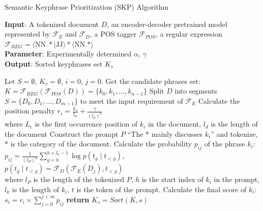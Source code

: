 \documentclass[11pt]{article}
\begin{document}
\begin{algorithm*}[htb]
    \scriptsize
    \caption{Semantic Keyphrase Prioritization (SKP) Algorithm}
    \label{alg:algorithm}
    \begin{multicols}{2}
    \vspace*{-7mm}
    \textbf{Input}: A tokenized document $D$, an encoder-decoder pretrained model represented by $\mathcal{F}_E$ and $\mathcal{F}_D$, a POS tagger $\mathcal{F}_{POS}$, a regular expression $\mathcal{F}_{REG} = \langle \text{NN.} \ast |\text{JJ} \rangle \ast \langle \text{NN.} \ast \rangle$\\
    \textbf{Parameter}: Experimentally determined $\alpha$, $\gamma$  \\
    \textbf{Output}: Sorted keyphrases set $K_{s}$\\
        \begin{algorithmic}[1] 
            \STATE Let $S=\emptyset$, $K_{s}=\emptyset$, $i=0$, $j=0$.
            \STATE Get the candidate phrases set: \\ $K=\mathcal{F}_{REG}(\mathcal{F}_{POS}(D))=\{k_0, k_1, \dots, k_{n-1}\}$
            \STATE Split $D$ into segments $S=\{D_0, D_1, \dots, D_{m-1}\}$ to meet the input requirement of $\mathcal{F}_E$
            \STATE Calculate the position penalty $r_i=\frac{L_c}{l_{d}} + \frac{\gamma}{(l_{d})^3}$\\
            where $L_c$ is the first occurrence position of $k_i$ in the document, $l_d$ is the length of the document 
            \STATE Construct the prompt $P$ “The * mainly discusses $k_i$” and tokenize, * is the category of the document.
            \STATE Calculate the probability $p_{ij}$ of the phrase $k_i$: \\
            $p_{ij} = \frac{1}{(l_P)^\alpha} \sum_{g=h}^{h+l_k-1} \log p(t_g \mid t_{<g})$, \\
            $p(t_g \mid t_{<g})=\mathcal{F}_D(\mathcal{F}_E(D_j), t_{<g})$ \\
            where $l_P$ is the length of the tokenized $P$, $h$ is the start index of $k_i$ in the prompt, $l_k$ is the length of $k_i$, $t$ is the token of the prompt.
            \ENDFOR
            \STATE Calculate the final score of $k_i$: $s_i=r_i\times\sum_{j=0}^{j<m}p_{ij}$
            \ENDFOR
            \STATE \textbf{return} $K_{s}=Sort(K, s)$
        \end{algorithmic}
    \end{multicols}
    \vspace*{-4mm}
\end{algorithm*}
\end{document}
